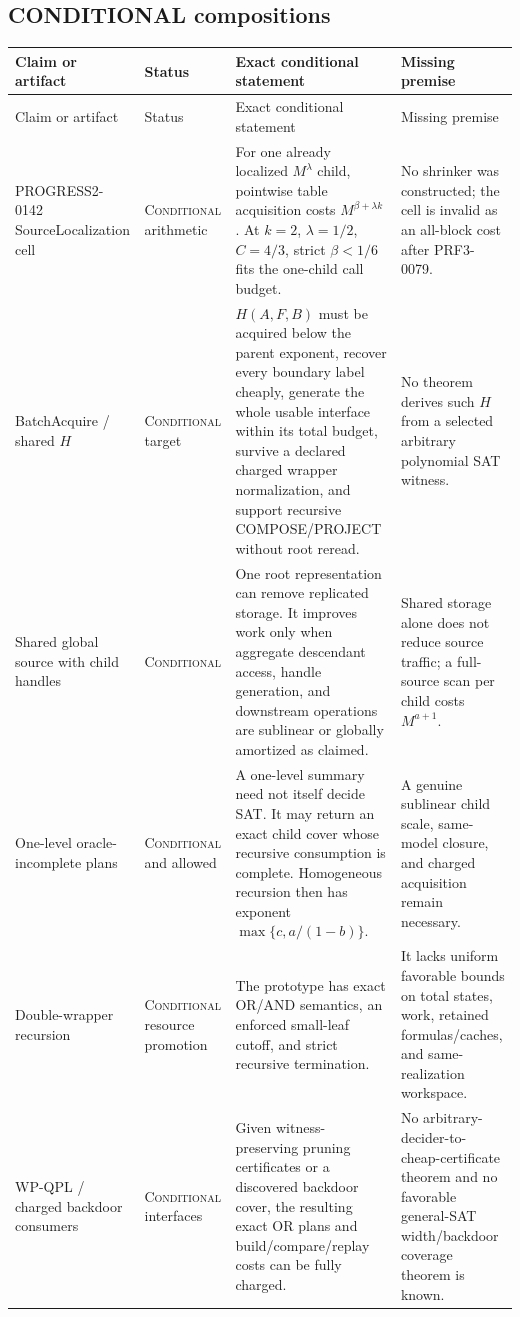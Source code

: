 \documentclass[10pt]{article}
\newcommand{\Conditional}{\textsc{Conditional}}
\begin{document}
\subsection*{CONDITIONAL compositions}
\small
\begin{longtable}{L{0.20\textwidth}L{0.18\textwidth}L{0.27\textwidth}L{0.29\textwidth}}
\toprule
Claim or artifact & Status & Exact conditional statement & Missing premise \\
\midrule
\endfirsthead
\toprule
Claim or artifact & Status & Exact conditional statement & Missing premise \\
\midrule
\endhead
\bottomrule
\endfoot

PROGRESS2-0142 SourceLocalization cell & \Conditional{} arithmetic &
For one already localized $M^\lambda$ child, pointwise table acquisition costs
$M^{\beta+\lambda k}$.  At $k=2$, $\lambda=1/2$, $C=4/3$, strict
$\beta<1/6$ fits the one-child call budget. & No shrinker was constructed;
the cell is invalid as an all-block cost after PRF3-0079. \\

BatchAcquire / shared $H$ & \Conditional{} target &
$H(A,F,B)$ must be acquired below the parent exponent, recover every boundary
label cheaply, generate the whole usable interface within its total budget,
survive a declared charged wrapper normalization, and support recursive
COMPOSE/PROJECT without root reread. & No theorem derives such $H$ from a
selected arbitrary polynomial SAT witness. \\

Shared global source with child handles & \Conditional{} &
One root representation can remove replicated storage.  It improves work
only when aggregate descendant access, handle generation, and downstream
operations are sublinear or globally amortized as claimed. & Shared storage
alone does not reduce source traffic; a full-source scan per child costs
$M^{a+1}$. \\

One-level oracle-incomplete plans & \Conditional{} and allowed &
A one-level summary need not itself decide SAT.  It may return an exact child
cover whose recursive consumption is complete.  Homogeneous recursion then
has exponent $\max\{c,a/(1-b)\}$. & A genuine sublinear child scale,
same-model closure, and charged acquisition remain necessary. \\

Double-wrapper recursion & \Conditional{} resource promotion &
The prototype has exact OR/AND semantics, an enforced small-leaf cutoff, and
strict recursive termination. & It lacks uniform favorable bounds on total
states, work, retained formulas/caches, and same-realization workspace. \\

WP-QPL / charged backdoor consumers & \Conditional{} interfaces &
Given witness-preserving pruning certificates or a discovered backdoor cover,
the resulting exact OR plans and build/compare/replay costs can be fully
charged. & No arbitrary-decider-to-cheap-certificate theorem and no favorable
general-SAT width/backdoor coverage theorem is known. \\

\end{longtable}
\normalsize
\end{document}
